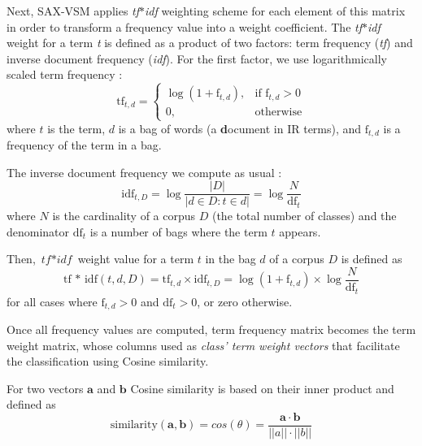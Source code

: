 \documentclass[conference]{IEEEtran}
\begin{document}
Next, SAX-VSM applies \textit{tf$\ast$idf} weighting scheme for each element 
of this matrix in order to transform a frequency value into a weight coefficient. 
The \textit{tf$\ast$idf} weight for a term \textit{t} is defined as a 
product of two factors: term frequency (\textit{tf}) and inverse document 
frequency (\textit{idf}). 
For the first factor, we use logarithmically scaled term frequency \cite{logtf}:
\begin{equation}
 \mbox{tf}_{t, d} =  \begin{cases} \log(1 + \mbox{f}_{t,d}), &\mbox{if f}_{t,d}>0  \\
0, & \mbox{otherwise} \end{cases}
\end{equation} 
where $t$ is the term, $d$ is a bag of words (a \textbf{d}ocument in IR terms), 
and $\mbox{f}_{t,d}$ is a frequency of the term in a bag.

The inverse document frequency we compute as usual \cite{logtf}:
\begin{equation}
 \mbox{idf}_{t, D} =  \log\frac{|D|}{|d \in D : t \in d|} = \log\frac{N}{\mbox{df}_{t}}
 \label{formula:idf}
\end{equation} 
where $N$ is the cardinality of a corpus $D$ (the total number of classes) and the 
denominator $\mbox{df}_{t}$ is a number of bags where the term $t$ appears.

Then, $\textit{tf$\ast$idf}$ weight value for a term $t$ in the bag $d$ of a corpus $D$ 
is defined as 
\begin{equation}
 \mbox{tf * idf}(t, d, D) =  \mbox{tf}_{t, d} \times \mbox{idf}_{t, D} = \log(1 + \mbox{f}_{t,d})
\times \log\frac{N}{\mbox{df}_{t}}
 \label{formula:tfidf}
\end{equation} 
for all cases where $\mbox{f}_{t,d}>0$ and $\mbox{df}_{t}>0$, or zero otherwise.

Once all frequency values are computed, term frequency matrix becomes 
the term weight matrix, whose columns used as \textit{class' term weight vectors} 
that facilitate the classification using Cosine similarity.

For two vectors $\boldsymbol{a}$ and $\boldsymbol{b}$ Cosine similarity is based 
on their inner product and defined as
\begin{equation}
\mbox{similarity}(\boldsymbol{a},\boldsymbol{b}) = cos(\theta) = \frac{ 
\mathbf{a} \cdot \mathbf{b} } {\left| \left| a \right| \right| \cdot \left| \left| b \right|
\right|}
\end{equation} 
\end{document}
